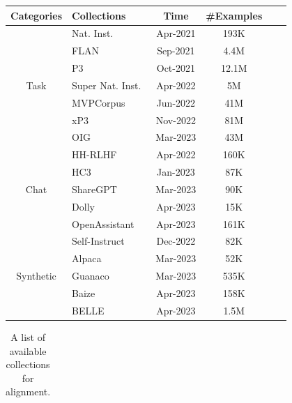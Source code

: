 {{{\begin{table}[h]
\begin{tabular}{clcccc}
    \textbf{Categories} & \textbf{Collections} & \textbf{Time} & \textbf{\#Examples} \\
    \midrule
    \multirow{7}{*}{Task}
    & Nat. Inst.~\cite{Mishra-ACL-2022-Cross} & Apr-2021 & 193K \\
    & FLAN~\cite{Wei-ICLR-2022-Finetuned} & Sep-2021 & 4.4M \\
    & P3~\cite{Bach-ACL-2022-PromptSource} & Oct-2021 & 12.1M \\
    & Super Nat. Inst.~\cite{Wang-EMNLP-2022-Super} & Apr-2022 & 5M \\
    & MVPCorpus~\cite{Tang-arxiv-2022-MVP} & Jun-2022 & 41M \\
    & xP3~\cite{Muennighoff-2022-arxiv-Crosslingual} & Nov-2022 & 81M \\
    & OIG\cite{Nguyen-laion-2023-The} & Mar-2023 & 43M \\
    \midrule
    \multirow{5}{*}{Chat}
    & HH-RLHF~\cite{Bai-arxiv-2022-Training} & Apr-2022 & 160K \\
    & HC3~\cite{guo-arxiv-2023-how} & Jan-2023 & 87K \\
    & ShareGPT~\cite{ShareGPT} & Mar-2023 & 90K \\
    & Dolly~\cite{Conover-2023-arxiv-Dolly} & Apr-2023 & 15K \\
    & OpenAssistant~\cite{kopf-arxiv-2023-openassistant} & Apr-2023 & 161K \\
    \midrule
    \multirow{5}{*}{Synthetic}
    & Self-Instruct~\cite{Wang-arXiv-2022-Self} & Dec-2022 & 82K \\
    & Alpaca~\cite{alpaca} & Mar-2023 & 52K \\
    & Guanaco~\cite{Cheung-2023-Guanaco} & Mar-2023 & 535K \\
    & Baize~\cite{xu-arxiv-2023-baize} & Apr-2023 & 158K \\
    & BELLE~\cite{ji-arxiv-2023-towards} & Apr-2023 & 1.5M \\
    \bottomrule
    \end{tabular}
    \label{tab:instruction-collection}
\end{table}


\begin{table}[h]
    \centering
    \caption{A list of available collections for alignment. %
    }\label{tab:rlhf-datasets}
    \footnotesize
    \renewcommand\tabcolsep{2.5pt}
    \begin{tabular}{lccc}
    \toprule


\end{tabular}
\end{table}}}}
